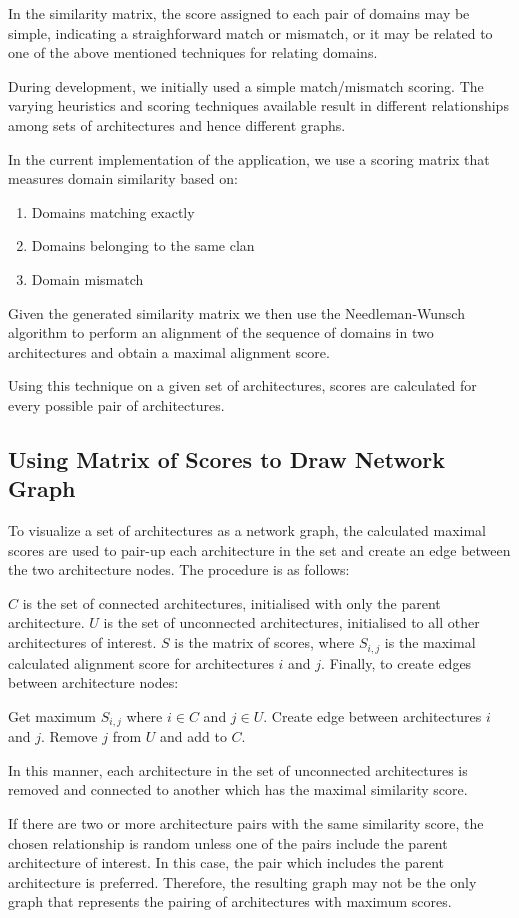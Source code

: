 In the similarity matrix, the score assigned to each pair of domains may be simple, indicating a straighforward match or mismatch, or it may be related to one of the above mentioned techniques for relating domains.

During development, we initially used a simple match/mismatch scoring. The varying heuristics and scoring techniques available result in different relationships among sets of architectures and hence different graphs.

In the current implementation of the application, we use a scoring matrix that measures domain similarity based on:
\begin{enumerate}
	\item Domains matching exactly
	\item Domains belonging to the same clan
	\item Domain mismatch
\end{enumerate}

Given the generated similarity matrix we then use the Needleman-Wunsch algorithm \cite{nwalgo} to perform an alignment of the sequence of domains in two architectures and obtain a maximal alignment score.

Using this technique on a given set of architectures, scores are calculated for every possible pair of architectures.


\subsection{Using Matrix of Scores to Draw Network Graph}

To visualize a set of architectures as a network graph, the calculated maximal scores are used to pair-up each architecture in the set and create an edge between the two architecture nodes. The procedure is as follows:

$C$ is the set of connected architectures, initialised with only the parent architecture. $U$ is the set of unconnected architectures, initialised to all other architectures of interest. $S$ is the matrix of scores, where $S_{i,j}$ is the maximal calculated alignment score for architectures $i$ and $j$. Finally, to create edges between architecture nodes:
\begin{algorithmic}
\STATE Get maximum $S_{i,j}$ where $i \in C$ and $j \in U$.
\STATE Create edge between architectures $i$ and $j$.
\STATE Remove $j$ from $U$ and add to $C$.
\ENDWHILE
\end{algorithmic}
In this manner, each architecture in the set of unconnected architectures is removed and connected to another which has the maximal similarity score.

If there are two or more architecture pairs with the same similarity score, the chosen relationship is random unless one of the pairs include the parent architecture of interest. In this case, the pair which includes the parent architecture is preferred. Therefore, the resulting graph may not be the only graph that represents the pairing of architectures with maximum scores. 



